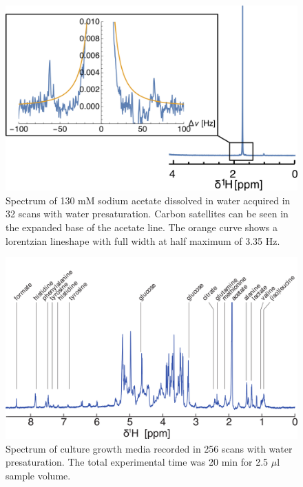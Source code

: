 \documentclass[preprint,5p]{elsarticle}
\begin{document}

\begin{figure}
\centering
\includegraphics[width=.7\linewidth,keepaspectratio=true]{./figures/lineshape.png}
\caption{Spectrum of 130 mM sodium acetate dissolved in water acquired in 32 scans with water presaturation. Carbon satellites can be seen in the expanded base of the acetate line. The orange curve shows a lorentzian lineshape with full width at half maximum of 3.35 Hz.}
\label{fig:lineshape}
\end{figure}

\begin{figure}
\centering
\includegraphics[width=.7\linewidth,keepaspectratio=true]{./figures/media-180125-005-bigger-font.png}
\caption{Spectrum of culture growth media recorded in 256 scans with water presaturation. The total experimental time was 20 min for 2.5 $\mu$l sample volume.}
\label{fig:media-spec}
\end{figure}
\end{document}
